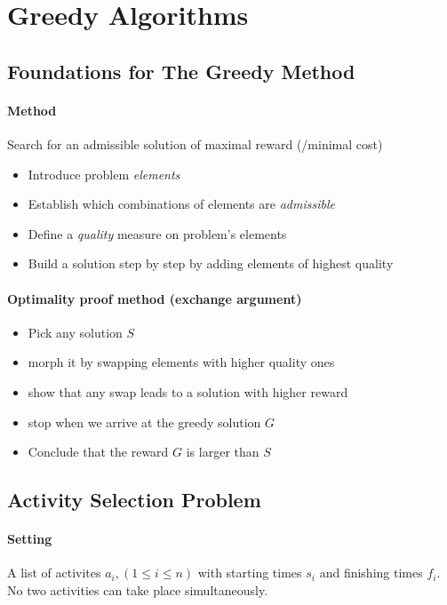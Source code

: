 
\section{Greedy Algorithms}

\subsection{Foundations for The Greedy Method}
\paragraph{Method}
Search for an admissible solution of maximal reward (/minimal cost)
\begin{itemize}
    \item Introduce problem \textit{elements}
    \item Establish which combinations of elements are \textit{admissible}
    \item Define a \textit{quality} measure on problem's elements
    \item Build a solution step by step by adding elements of highest quality
\end{itemize}

\paragraph{Optimality proof method (exchange argument)}
\begin{itemize}
    \item Pick any solution \(S\)
    \item morph it by swapping elements with higher quality ones
    \item show that any swap leads to a solution with higher reward
    \item stop when we arrive at the greedy solution \(G\)
    \item Conclude that the reward \(G\) is larger than \(S\)
\end{itemize}

\subsection{Activity Selection Problem}
\paragraph{Setting} 
A list of activites \(a_i, (1 \leq i \leq n)\) with starting times
\(s_i\) and finishing times \(f_i\). No two activities can take place simultaneously.

